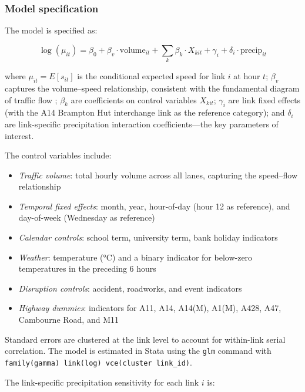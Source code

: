 \documentclass[review]{elsarticle}
\begin{document}
\subsubsection{Model specification}

The model is specified as:

\begin{equation}
\label{eq:glm}
\log(\mu_{it}) = \beta_0 + \beta_v \cdot \text{volume}_{it} + \sum_k \beta_k \cdot X_{kit} + \gamma_i + \delta_i \cdot \text{precip}_{it}
\end{equation}

\noindent where $\mu_{it} = E[s_{it}]$ is the conditional expected speed for link $i$ at hour $t$; $\beta_v$ captures the volume--speed relationship, consistent with the fundamental diagram of traffic flow \citep{greenshields1935study}; $\beta_k$ are coefficients on control variables $X_{kit}$; $\gamma_i$ are link fixed effects (with the A14 Brampton Hut interchange link as the reference category); and $\delta_i$ are link-specific precipitation interaction coefficients---the key parameters of interest.

The control variables include:

\begin{itemize}
    \item \textit{Traffic volume}: total hourly volume across all lanes, capturing the speed--flow relationship
    \item \textit{Temporal fixed effects}: month, year, hour-of-day (hour 12 as reference), and day-of-week (Wednesday as reference)
    \item \textit{Calendar controls}: school term, university term, bank holiday indicators
    \item \textit{Weather}: temperature (\si{\degreeCelsius}) and a binary indicator for below-zero temperatures in the preceding 6 hours
    \item \textit{Disruption controls}: accident, roadworks, and event indicators
    \item \textit{Highway dummies}: indicators for A11, A14, A14(M), A1(M), A428, A47, Cambourne Road, and M11
\end{itemize}

Standard errors are clustered at the link level to account for within-link serial correlation. The model is estimated in Stata using the \texttt{glm} command with \texttt{family(gamma) link(log) vce(cluster link\_id)}.

The link-specific precipitation sensitivity for each link $i$ is:
\end{document}
